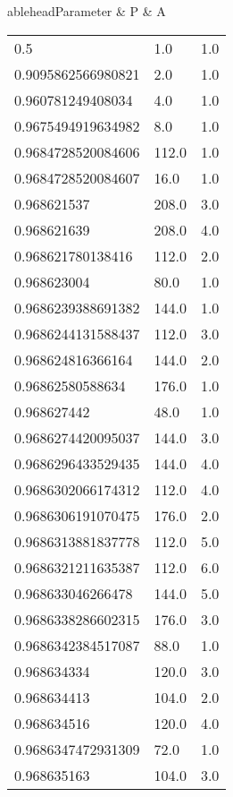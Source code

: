 \begin{center}
\twocolumn
{}
	ablehead{Parameter & P & A \\}
\tabletail{%
}
\tablelasttail{\hline}
\begin{supertabular}[H]{p{0.30\textwidth}p{0.05\textwidth}p{0.05\textwidth}}
0.5 & 1.0 & 1.0 \\ 
0.9095862566980821 & 2.0 & 1.0 \\ 
0.960781249408034 & 4.0 & 1.0 \\ 
0.9675494919634982 & 8.0 & 1.0 \\ 
0.9684728520084606 & 112.0 & 1.0 \\ 
0.9684728520084607 & 16.0 & 1.0 \\ 
0.968621537 & 208.0 & 3.0 \\ 
0.968621639 & 208.0 & 4.0 \\ 
0.968621780138416 & 112.0 & 2.0 \\ 
0.968623004 & 80.0 & 1.0 \\ 
0.9686239388691382 & 144.0 & 1.0 \\ 
0.9686244131588437 & 112.0 & 3.0 \\ 
0.968624816366164 & 144.0 & 2.0 \\ 
0.96862580588634 & 176.0 & 1.0 \\ 
0.968627442 & 48.0 & 1.0 \\ 
0.9686274420095037 & 144.0 & 3.0 \\ 
0.9686296433529435 & 144.0 & 4.0 \\ 
0.9686302066174312 & 112.0 & 4.0 \\ 
0.9686306191070475 & 176.0 & 2.0 \\ 
0.9686313881837778 & 112.0 & 5.0 \\ 
0.9686321211635387 & 112.0 & 6.0 \\ 
0.968633046266478 & 144.0 & 5.0 \\ 
0.9686338286602315 & 176.0 & 3.0 \\ 
0.9686342384517087 & 88.0 & 1.0 \\ 
0.968634334 & 120.0 & 3.0 \\ 
0.968634413 & 104.0 & 2.0 \\ 
0.968634516 & 120.0 & 4.0 \\ 
0.9686347472931309 & 72.0 & 1.0 \\ 
0.968635163 & 104.0 & 3.0 \\ 

\end{supertabular}
\end{center}
